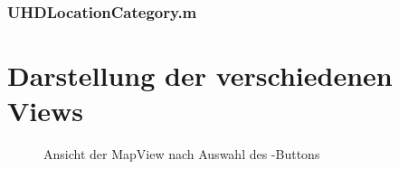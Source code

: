 \documentclass{report}
\begin{document}
\vspace{0,5cm}

\subsubsection{UHDLocationCategory.m}


\newpage

\section{Darstellung der verschiedenen Views}

\begin{figure}[ht]\label{bild_2}
\centering {}
\caption{Ansicht der MapView nach Auswahl des -Buttons}
\end{figure}
\end{document}
